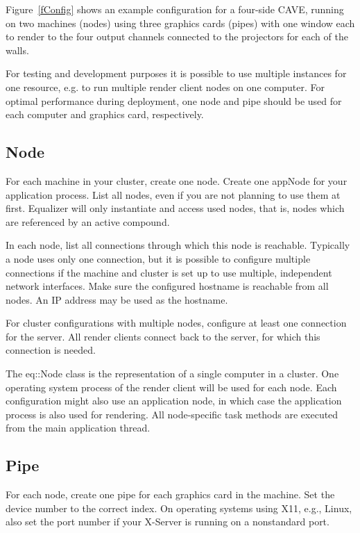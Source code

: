 \documentclass[10pt,a4]{scrartcl}
\newcommand{\fig}[1]{Figure~\ref{#1}}
\begin{document}
\fig{fConfig} shows an example configuration for a four-side
CAVE, running on two machines (nodes) using three graphics
cards (pipes) with one window each to render to the four output channels
connected to the projectors for each of the walls.

For testing and development purposes it is possible to use multiple
instances for one resource, e.g. to run multiple render client nodes on
one computer. For optimal performance during deployment, one node and
pipe should be used for each computer and graphics card, respectively.

\subsection{Node}

For each machine in your cluster, create one \textsf{node}. Create one
\textsf{appNode} for your application process. List all nodes, even if you are
not planning to use them at first. Equalizer will only instantiate and access
used nodes, that is, nodes which are referenced by an active compound.

In each node, list all \textsf{connection}s through which this node is
reachable. Typically a node uses only one connection, but it is possible
to configure multiple connections if the machine and cluster is set up
to use multiple, independent network interfaces. Make sure the
configured \textsf{hostname} is reachable from all nodes. An IP address
may be used as the hostname.

For cluster configurations with multiple nodes, configure at least one
connection for the server. All render clients connect back to the server, for
which this connection is needed.

The \textsf{eq::Node} class is the representation of a single computer
in a cluster. One operating system process of the render client will be
used for each node. Each configuration might also use an application
node, in which case the application process is also used for
rendering. All node-specific task methods are executed from the main
application thread.

\subsection{Pipe}

For each node, create one \textsf{pipe} for each graphics card in the
machine. Set the \textsf{device} number to the correct index. On
operating systems using X11, e.g., Linux, also set the port number if
your X-Server is running on a nonstandard port.
\end{document}
